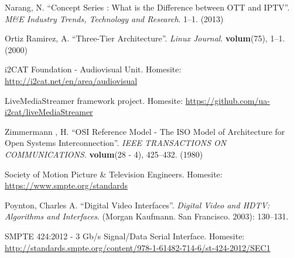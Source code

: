 \documentclass[english,final]{setup/eetac_tfc_pfc}
\begin{document}
%  

\cleardoublepage
{}
\begin{thebibliography}{2}



Narang, N.
``Concept Series : What is the Difference between OTT and IPTV''. {\it M\&E Industry Trends, Technology and Research}.
1--1. (2013) 

Ortiz Ramirez, A.
``Three-Tier Architecture''. {\it Linux Journal}.
{\bf volum}(75),
1--1. (2000) 

i2CAT Foundation - Audiovisual Unit. Homesite: \url{http://i2cat.net/en/area/audiovisual}

LiveMediaStreamer framework project. Homesite: \url{https://github.com/ua-i2cat/liveMediaStreamer}

Zimmermann , H.
``OSI Reference Model - The ISO Model of Architecture for Open Systems Interconnection''. {\it IEEE TRANSACTIONS ON COMMUNICATIONS}.
{\bf volum}(28 - 4),
425--432. (1980) 

Society of Motion Picture \& Television Engineers. Homesite: \url{https://www.smpte.org/standards}

Poynton, Charles A.
``Digital Video Interfaces''. {\it Digital Video and HDTV: Algorithms and Interfaces}.
(Morgan Kaufmann. San Francisco. 2003): 130--131.

SMPTE 424:2012 - 3 Gb/s Signal/Data Serial Interface. Homesite: \url{http://standards.smpte.org/content/978-1-61482-714-6/st-424-2012/SEC1}


\end{thebibliography}
\end{document}
